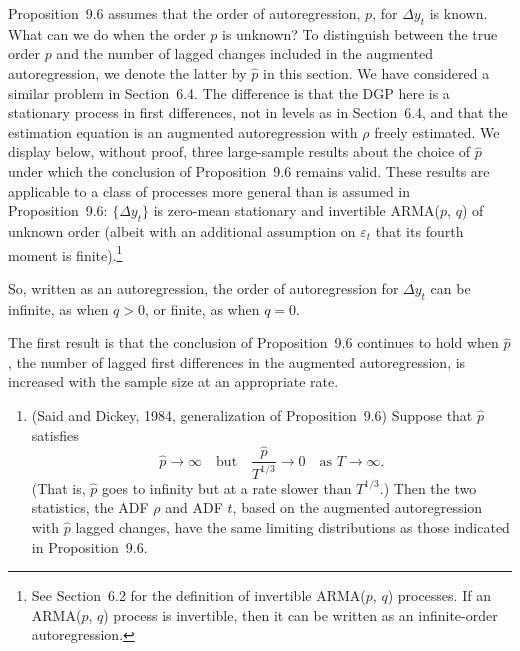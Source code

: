Proposition~9.6 assumes that the order of autoregression, $p$, for $\Delta y_t$ is known.
What can we do when the order $p$ is unknown? To distinguish between the true
order $p$ and the number of lagged changes included in the augmented autoregression, we denote the latter by $\hat{p}$ in this section. We have considered a similar problem in Section~6.4. The difference is that the DGP here is a stationary process in
first differences, not in levels as in Section~6.4, and that the estimation equation is
an augmented autoregression with $\rho$ freely estimated. We display below, without
proof, three large-sample results about the choice of $\hat{p}$ under which the conclusion of Proposition~9.6 remains valid. These results are applicable to a class of
processes more general than is assumed in Proposition~9.6: $\{\Delta y_t\}$ is zero-mean
stationary and invertible ARMA($p$, $q$) of unknown order (albeit with an additional
assumption on $\varepsilon_t$ that its fourth moment is finite).\footnote{See Section~6.2 for the definition of invertible ARMA($p$, $q$) processes. If an ARMA($p$, $q$) process is invertible, then it can be written as an infinite-order autoregression.}

So, written as an autoregression, the order of autoregression for $\Delta y_t$ can be
infinite, as when $q > 0$, or finite, as when $q = 0$.

The first result is that the conclusion of Proposition~9.6 continues to hold when
$\hat{p}$, the number of lagged first differences in the augmented autoregression, is increased with the sample size at an appropriate rate.

\begin{enumerate}
\item (Said and Dickey, 1984, generalization of Proposition~9.6) \enspace Suppose that $\hat{p}$
satisfies
\begin{equation}
\label{eq:9.4.28}
\hat{p} \to \infty \quad \text{but} \quad \frac{\hat{p}}{T^{1/3}} \to 0 \quad \text{as } T \to \infty.
\end{equation}
(That is, $\hat{p}$ goes to infinity but at a rate slower than $T^{1/3}$.) Then the two
statistics, the ADF $\rho$ and ADF $t$, based on the augmented autoregression with
$\hat{p}$ lagged changes, have the same limiting distributions as those indicated in
Proposition~9.6.
\end{enumerate}

